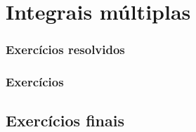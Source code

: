 
\chapter{Integrais múltiplas}\label{chap:integ}
\emconstrucao




\subsection*{Exercícios resolvidos}
\construirExeresol

\subsection*{Exercícios}
\construirExer

\section{Exercícios finais}
\construirExer

